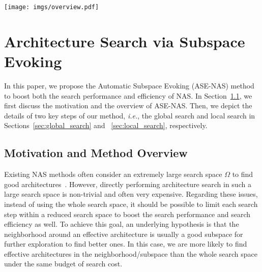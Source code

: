 \documentclass[lettersize,journal]{IEEEtran}
\newcommand{\sexyname}{ASE-NAS\xspace}
\def\mG{{\mathcal G}}
\def\mL{{\mathcal L}}
\def\ie{\emph{i.e.}} \def\Ie{\emph{I.e.}}
\begin{document}
\begin{figure*}[t]
\centering
\texttt{[image: imgs/overview.pdf]}
\caption{An overview of our \sexyname. We build a set of subspaces $\{\Omega_{\alpha_i}\}_{i=1}^K$ centered on randomly sampled candidate architectures $\{\alpha_i\}_{i=1}^K$ and construct a subspace graph $\mG$ to model the relationships among these subspaces.
By taking $\mG$ as the input, the controller first evokes a promising subspace $\Omega_\alpha \sim \pi_{G}(\cdot | \mG; \theta_{\mG})$ via global search policy and then predicts an architecture modification $\Delta \alpha \sim \pi_{L}(\cdot | \Omega{\alpha}; \theta_{\mL})$ via local search policy.
Next, we update the candidate architecture $\alpha$ with the resultant architecture $\beta=\alpha \oplus \Delta \alpha$ if $\beta$ has better performance than $\alpha$ (\ie, $R(\beta | \alpha) > 0$).
}
\label{fig:overview}
\end{figure*}

\section{Architecture Search via Subspace Evoking}

In this paper, we propose the Automatic Subspace Evoking (\sexyname) method to boost both the search performance and efficiency of NAS.
In Section~\ref{sec:overall}, we first discuss the motivation and the overview of \sexyname.
Then, we depict the details of two key steps of our method, \ie, the global search and local search in Sections~\ref{sec:global_search} and ~\ref{sec:local_search}, respectively.


\subsection{Motivation and Method Overview}
\label{sec:overall}
Existing NAS methods often consider an extremely large search space $\Omega$ to find good architectures~\cite{pham2018efficient,liu2018darts, Cai2020Once}. 
However, directly performing architecture search in such a large search space is non-trivial and often very expensive.
Regarding these issues, instead of using the whole search space, it should be possible to limit each search step within a reduced search space to boost the search performance and search efficiency as well.
To achieve this goal, an underlying hypothesis is that the neighborhood around an effective architecture is usually a good subspace for further exploration to find better ones.
In this case, we are more likely to find effective architectures in the neighborhood/subspace than the whole search space under the same budget of search cost.
 
\end{document}
